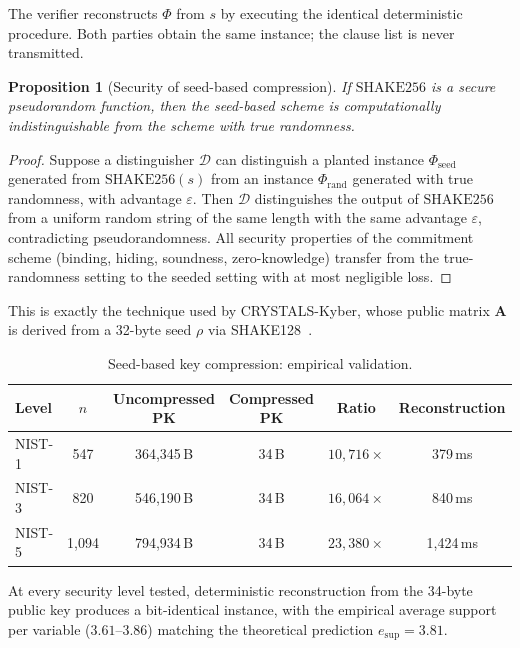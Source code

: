 \documentclass[11pt]{article}
\newtheorem{proposition}[theorem]{Proposition}
\begin{document}
The verifier reconstructs $\Phi$ from $s$ by executing the identical deterministic procedure.  Both parties obtain the same instance; the clause list is never transmitted.

\begin{proposition}[Security of seed-based compression]\label{prop:seed}
If $\mathrm{SHAKE256}$ is a secure pseudorandom function, then the seed-based scheme is computationally indistinguishable from the scheme with true randomness.
\end{proposition}

\begin{proof}
Suppose a distinguisher $\mathcal{D}$ can distinguish a planted instance $\Phi_{\mathrm{seed}}$ generated from $\mathrm{SHAKE256}(s)$ from an instance $\Phi_{\mathrm{rand}}$ generated with true randomness, with advantage $\varepsilon$.  Then $\mathcal{D}$ distinguishes the output of $\mathrm{SHAKE256}$ from a uniform random string of the same length with the same advantage $\varepsilon$, contradicting pseudorandomness.  All security properties of the commitment scheme (binding, hiding, soundness, zero-knowledge) transfer from the true-randomness setting to the seeded setting with at most negligible loss.
\end{proof}

This is exactly the technique used by CRYSTALS-Kyber, whose public matrix $\mathbf{A}$ is derived from a 32-byte seed $\rho$ via SHAKE128~\cite{DSS22}.

\begin{table}[ht]
\centering
\caption{Seed-based key compression: empirical validation.}\label{tab:compress}
\begin{tabular}{@{}lccccc@{}}
\toprule
Level & $n$ & Uncompressed PK & Compressed PK & Ratio & Reconstruction \\
\midrule
NIST-1 & 547 & 364{,}345\,B & 34\,B & $10{,}716\times$ & 379\,ms \\
NIST-3 & 820 & 546{,}190\,B & 34\,B & $16{,}064\times$ & 840\,ms \\
NIST-5 & 1{,}094 & 794{,}934\,B & 34\,B & $23{,}380\times$ & 1{,}424\,ms \\
\bottomrule
\end{tabular}
\end{table}

At every security level tested, deterministic reconstruction from the 34-byte public key produces a bit-identical instance, with the empirical average support per variable ($3.61$--$3.86$) matching the theoretical prediction $e_{\mathrm{sup}} = 3.81$.
\end{document}

